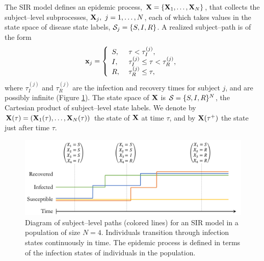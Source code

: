 The SIR model defines an epidemic process, $ \mathbf{X} = \lbrace\mathbf{X}_1,\dots,\mathbf{X}_N\rbrace $, that collects the subject--level subprocesses, $ \mathbf{X}_j,\ j=1,\dots,N $, each of which takes values in the state space of disease state labels, $ \mathcal{S}_j= \lbrace S,I,R\rbrace $. A realized subject--path is of the form 
\begin{equation}
\mathbf{x}_j = \left \lbrace\begin{array}{ll}
S,\ & \tau < \tau_I^{(j)},\\
I,\ & \tau_I^{(j)}\leq\tau<\tau_R^{(j)},\\
R,\ & \tau_R^{(j)} \leq \tau,
\end{array}\right .
\end{equation}
where $ \tau_I^{(j)} $ and $ \tau_{R}^{(j)} $ are the infection and recovery times for subject $ j $, and are possibly infinite (Figure \ref{fig:subjectsamplepaths}). The state space of $ \mathbf{X} $ is  $ \mathcal{S} = \lbrace S,I,R\rbrace^N $, the Cartesian product of subject--level state labels. We denote by $ \mathbf{X}(\tau) = \left (\mathbf{X}_1(\tau),\dots,\mathbf{X}_N(\tau)\right ) $ the state of $ \mathbf{X} $ at time $ \tau $, and by $ \mathbf{X}(\tau^+) $ the state just after time $ \tau $. 

\begin{figure}[htbp]
	\centering
	\includegraphics[width=0.8\linewidth]{figures/subject_sample_paths}
	\caption{Diagram of subject--level paths (colored lines) for an SIR model in a population of size $ N=4 $. Individuals transition through infection states continuously in time. The epidemic process is defined in terms of the infection states of individuals in the population.}
	\label{fig:subjectsamplepaths}
\end{figure}

